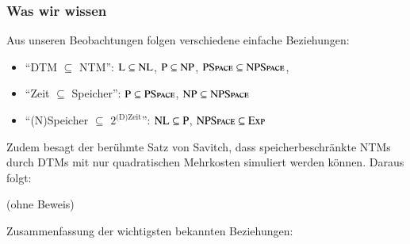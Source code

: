 \documentclass[aspectratio=1610,onlymath]{beamer}
\begin{document}
\begin{frame}\frametitle{Was wir wissen}

Aus unseren Beobachtungen folgen verschiedene einfache Beziehungen:
\begin{itemize}
\item \alert{"`DTM $\subseteq$ NTM"':}
	${\textsc{L}}\subseteq {\textsc{NL}}$,
	${\textsc{P}}\subseteq {\textsc{NP}}$,
	${\textsc{PSpace}}\subseteq {\textsc{NPSpace}}$,
\item \alert{"`Zeit $\subseteq$ Speicher"':}
	${\textsc{P}}\subseteq {\textsc{PSpace}}$,
	${\textsc{NP}}\subseteq {\textsc{NPSpace}}$
\item \alert{"`(N)Speicher $\subseteq$ $2^{\text{(D)Zeit}}$"':}
	${\textsc{NL}}\subseteq {\textsc{P}}$,
	${\textsc{NPSpace}}\subseteq {\textsc{Exp}}$
\end{itemize}\bigskip\pause

Zudem besagt der berühmte \alert{Satz von Savitch}, dass speicherbeschränkte NTMs durch DTMs mit nur quadratischen Mehrkosten simuliert werden können. Daraus folgt:


(ohne Beweis)\bigskip\pause

Zusammenfassung der wichtigsten bekannten Beziehungen:
\theobox{
\[\Scomplclass{L}\subseteq\Scomplclass{NL}\subseteq \Scomplclass{P}\subseteq\Scomplclass{NP}\subseteq\Scomplclass{PSpace}= \Scomplclass{NPSpace}\subseteq \Scomplclass{Exp}\subseteq \Scomplclass{NExp}\]
\vspace{-2.5ex}
}

\end{frame}
\end{document}
